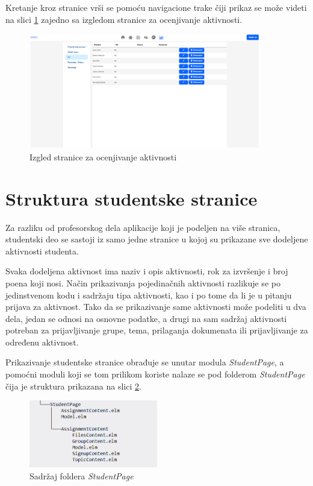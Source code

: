 \documentclass[12pt,oneside]{memoir}
\begin{document}
Kretanje kroz stranice vrši se pomoću navigacione trake čiji prikaz se može videti na
slici \ref{fig:professor-page} zajedno sa izgledom stranice za ocenjivanje aktivnosti.
\begin{figure}[!ht]
  \centering
  \includegraphics[width=0.9\textwidth]{professor-page.png}
  \caption{Izgled stranice za ocenjivanje aktivnosti}
  \label{fig:professor-page}
\end{figure}
\section{Struktura studentske stranice}
Za razliku od profesorskog dela aplikacije koji je podeljen na više stranica,
studentski deo se sastoji iz samo jedne stranice u kojoj su prikazane sve dodeljene
aktivnosti studenta. 

Svaka dodeljena aktivnost ima naziv i opis aktivnosti, rok za izvršenje
i broj poena koji nosi. Način prikazivanja pojedinačnih aktivnosti razlikuje se po
jedinstvenom kodu i sadržaju tipa aktivnosti, kao i po tome da li je u pitanju prijava
za aktivnost. Tako da se prikazivanje same aktivnosti može podeliti u dva dela,
jedan se odnosi na osnovne podatke, a drugi na sam sadržaj aktivnosti potreban za prijavljivanje grupe,
tema, prilaganja dokumenata ili prijavljivanje za određenu aktivnost.

Prikazivanje studentske stranice obrađuje se unutar modula \emph{StudentPage},
a pomoćni moduli koji se tom prilikom koriste nalaze se pod folderom \emph{StudentPage} čija je
struktura prikazana na slici \ref{fig:student-dir}.
\begin{figure}[!ht]
  \centering
  \includegraphics[width=0.5\textwidth]{student-dir.png}
  \caption{Sadržaj foldera \emph{StudentPage}}
  \label{fig:student-dir}
\end{figure}
\end{document}
